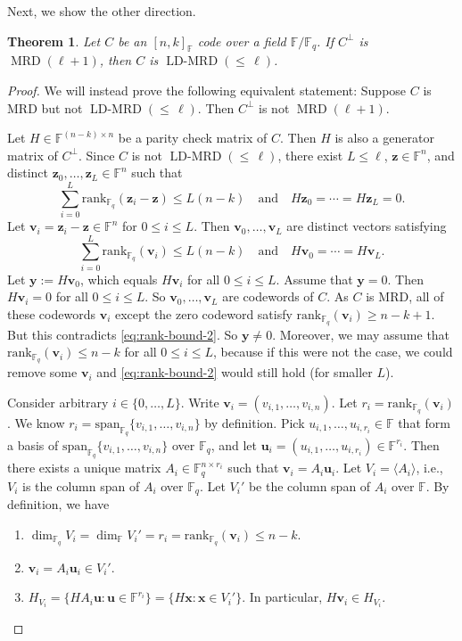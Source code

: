 \documentclass[11pt]{article}
\theoremstyle{plain}
\newtheorem{thm}{Theorem}[section]
\theoremstyle{definition}
\theoremstyle{remark}
\newcommand{\ldmrd}[1]{\operatorname{LD-MRD}({\leq}\,#1)}
\newcommand{\F}{\mathbb{F}}
\newcommand{\spa}{\mathrm{span}}
\newcommand{\bv}{\bm{v}}
\newcommand{\bu}{\bm{u}}
\newcommand{\by}{\bm{y}}
\newcommand{\bx}{\bm{x}}
\newcommand{\bz}{\bm{z}}
\newcommand{\rank}{\mathrm{rank}}
\begin{document}
Next, we show the other direction.

\begin{thm}\label{thm:mrd2ldmrd}
Let $C$ be an $[n,k]_{\F}$ code over a field $\F/\F_q$.
If $C^\perp$ is $\operatorname{MRD}(\ell+1)$, then $C$ is $\ldmrd{\ell}$.
\end{thm}
\begin{proof} 
We will instead prove the following equivalent statement: Suppose $C$ is MRD but not $\ldmrd{\ell}$. Then $C^\perp$ is not $\operatorname{MRD}(\ell+1)$. 

Let $H\in \F^{(n-k)\times n}$ be a parity check matrix of $C$. Then $H$ is also a generator matrix of $C^{\perp}$. Since $C$ is not $\ldmrd{\ell}$, there exist $L\leq \ell$, $\bz\in \F^n$, and distinct $\bz_0,\dots,\bz_L\in\F^n$ such that
\[
\sum_{i=0}^{L}\rank_{\F_q}(\bz_i-\bz)\leq L(n-k) \quad\text{and}\quad H\bz_0=\cdots=H\bz_{L}=0.
\]
Let $\bv_i=\bz_i-\bz\in\F^n$ for $0\leq i\leq L$.
Then $\bv_0,\ldots,\bv_{L}$ are distinct vectors satisfying 
\begin{equation}\label{eq:rank-bound-2}
\sum_{i=0}^{L}\rank_{\F_q}(\bv_i)\leq L(n-k) \quad\text{and}\quad H\bv_0=\cdots=H\bv_{L}.
\end{equation}
Let $\by:=H\bv_0$, which equals $H\bv_{i}$ for all $0\leq i\leq L$. Assume that $\by=0$. Then $H \bv_i=0$ for all $0\leq i\leq L$. So $\bv_0,\dots,\bv_L$ are codewords of $C$. As $C$ is MRD, all of these codewords $\bv_i$ except the zero codeword satisfy $\rank_{\F_q}(\bv_i)\geq n-k+1$. But this contradicts \eqref{eq:rank-bound-2}.
So $\by\neq 0$.
Moreover, we may assume that $\rank_{\F_q}(\bv_i)\leq n-k$ for all $0\leq i\leq L$, because if this were not the case, we could remove some $\bv_i$ and \eqref{eq:rank-bound-2} would still hold (for smaller $L$).


Consider arbitrary $i\in \{0,\dots,L\}$.
Write $\bv_i=(v_{i,1},\dots,v_{i,n})$.
Let $r_i=\rank_{\F_q}(\bv_i)$.
We know $r_i=\spa_{\F_q}\{v_{i,1},\dots,v_{i,n}\}$ by definition.
Pick $u_{i,1},\dots,u_{i,r_i}\in \F$ that form a basis of $\spa_{\F_q}\{v_{i,1},\dots,v_{i,n}\}$ over $\F_q$, and let $\bu_i=(u_{i,1},\dots,u_{i,r_i})\in\F^{r_i}$.
Then there exists a unique matrix $A_i\in\F_q^{n\times r_i}$ such that $\bv_i=A_i \bu_i$.
Let $V_i=\langle A_i\rangle$, i.e., $V_i$ is the column span of $A_i$ over $\F_q$.
Let $V_i'$ be the column span of $A_i$ over $\F$.
By definition, we have
\begin{enumerate}
\item $\dim_{\F_q} V_i=\dim_{\F} V_i'=r_i=\rank_{\F_q}(\bv_i)\leq n-k$.
\item $\bv_i=A_i\bu_i\in V_i'$.
\item $H_{V_i}=\{HA_i \bu: \bu\in \F^{r_i}\}=\{H\bx: \bx\in V_i'\}$. In particular, $H \bv_i\in H_{V_i}$.
\end{enumerate}


\end{proof}
\end{document}
